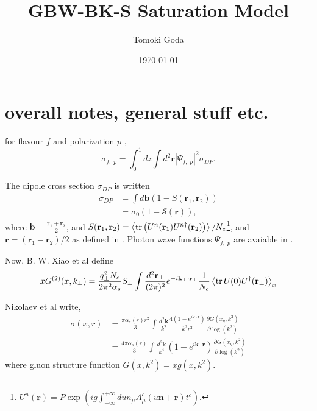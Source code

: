\documentclass[12pt]{article}
\begin{document}
	
\author{Tomoki Goda}
\title{GBW-BK-S Saturation Model}
\date{\today}

\maketitle
	
{}


\section{overall notes, general stuff etc.}

for flavour $f$ and polarization $p$ \cite{cambqcd}\cite{gbw1998},
\begin{equation}
	\sigma_{f,\;p}=\int_{0}^{1} d z \int d^2\mathbf{r}|\Psi_{f,\;p}|^2 \sigma_{DP}.
\end{equation}

The dipole cross section $\sigma_{DP}$ is written \cite{cambqcd}%
\begin{align}
	\sigma_{DP}&=\int d\mathbf{b}(1-S(\mathbf{r}_1,\mathbf{r}_2)) \\
	&=\sigma_0 (1-\mathcal{S}(\mathbf{r})),
\end{align}
where $\mathbf{b}=\frac{\mathbf{r_1}+\mathbf{r_2}}{2}$, and $S(\mathbf{r}_1,\mathbf{r}_2) =\expval{\tr\left( U^n(\mathbf{r}_1) U^{n\dagger}(\mathbf{r}_2)\right)}/N_c$\footnote{$U ^n (\mathbf{r})=P \exp\left(i g \int^{+\infty}_{-\infty}du n_\mu A^c_\mu (u \mathbf{n}+\mathbf{r}) t^c\right)$. %
}, and $ \mathbf{r}=(\mathbf{r}_1-\mathbf{r}_2)/2 $ as defined in \cite{cambqcd}.
\newline
Photon wave functions $\Psi_{f,\;p}$ are avaiable in \cite{gbw1998} \cite{nikolaev1994}.

Now, B. W. Xiao et al \cite{xiao2017} define
\begin{equation}
x G^{(2)}(x, k_\perp)=\frac{q_\perp^2 N_c}{2 \pi^2 \alpha_s} S_\perp \int \frac{d^2\mathbf{r}_\perp}{(2\pi)^2} e^{-i \mathbf{k}_\perp\cdot \mathbf{r}_\perp}\frac{1}{N_c}\expval{\tr U(0)U^\dagger(\mathbf{r}_\perp)}_x
\end{equation}

Nikolaev et al write\cite{nikolaev1994},
\begin{align}
\sigma(x,r)&=\frac{\pi \alpha_s(r) r^2}{3}\int\frac{d^2 \mathbf{k}}{k^2}\frac{4\left(1-e^{i\mathbf{k}\cdot\mathbf{r}}\right)}{k^2 r^2}\frac{\partial G(x_g,k^2)}{\partial \log(k^2)}\\
&=\frac{4 \pi \alpha_s(r) }{3}\int\frac{d^2 \mathbf{k}}{k^4}\left(1-e^{i\mathbf{k}\cdot\mathbf{r}}\right) \frac{\partial G(x_g,k^2)}{\partial \log(k^2)}
\label{eq:niktot}
\end{align}
where gluon structure function $G(x,k^2)=x g(x,k^2)$.
\end{document}
